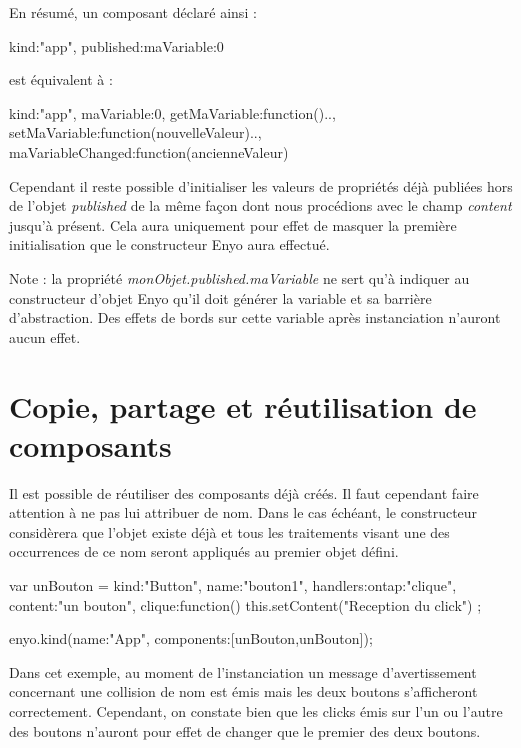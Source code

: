 \documentclass[11pt,a4paper]{report}
\begin{document}
En résumé, un composant déclaré ainsi : 
\begin{JavaScript}
  {kind:"app", published:{maVariable:0}}
\end{JavaScript}
est équivalent à :
\begin{JavaScript}
  {kind:"app", maVariable:0, 
    getMaVariable:function(){..}, 
    setMaVariable:function(nouvelleValeur){..}, 
    maVariableChanged:function(ancienneValeur){}}
\end{JavaScript}


Cependant il reste possible d'initialiser les valeurs de propriétés 
déjà publiées hors de l'objet \emph{published} de la même façon dont nous procédions 
avec le champ \emph{content} jusqu'à présent. Cela aura uniquement pour effet de  masquer la première 
initialisation que le constructeur Enyo aura effectué.

Note : la propriété \emph{monObjet.published.maVariable} ne sert qu'à indiquer au 
constructeur d'objet Enyo qu'il doit générer la variable et sa barrière d'abstraction. 
Des effets de bords sur cette variable après instanciation n'auront aucun effet. 

\section{Copie, partage et réutilisation de composants}

Il est possible de réutiliser des composants déjà créés. Il faut cependant faire attention à ne pas
lui attribuer de nom. Dans le cas échéant, le constructeur considèrera que l'objet existe déjà et 
tous les traitements visant une des occurrences de ce nom seront appliqués au premier objet défini.

\begin{JavaScript}
var unBouton = {kind:"Button", name:"bouton1", 
                handlers:{ontap:"clique"}, 
                content:"un bouton",
                clique:function(){
                  this.setContent("Reception du click")
                }
};

enyo.kind({name:"App", components:[unBouton,unBouton]});
\end{JavaScript}

Dans cet exemple, au moment de l'instanciation un message d'avertissement concernant une collision de nom 
est émis mais les deux boutons s'afficheront correctement. Cependant, on constate bien que les clicks 
émis sur l'un ou l'autre des boutons n'auront pour effet de changer que le premier des deux boutons.\\\medskip
\end{document}
